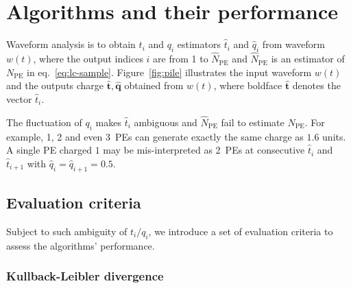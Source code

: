 \section{Algorithms and their performance}
\label{sec:algorithm}

Waveform analysis is to obtain $t_i$ and $q_i$ estimators $\hat{t}_i$ and $\hat{q}_i$ from waveform $w(t)$, where the output indices $i$ are from 1 to $\hat{N}_\mathrm{PE}$ and $\hat{N}_\mathrm{PE}$ is an estimator of $N_\mathrm{PE}$ in eq.~\eqref{eq:lc-sample}. Figure~\ref{fig:pile} illustrates the input waveform $w(t)$ and the outputs charge $\bm{\hat{t}}, \hat{\bm{q}}$ obtained from $w(t)$, where boldface $\hat{\bm{t}}$ denotes the vector $\hat{t}_i$. 

The fluctuation of $q_i$ makes $\hat{t}_i$ ambiguous and $\hat{N}_\mathrm{PE}$ fail to estimate $N_\mathrm{PE}$. For example, 1, 2 and even 3~PEs can generate exactly the same charge as $1.6$ units.  A single PE charged $1$ may be mis-interpreted as 2~PEs at consecutive $\hat{t}_i$ and $\hat{t}_{i+1}$ with $\hat{q}_i=\hat{q}_{i+1}=0.5$.

\subsection{Evaluation criteria}
\label{sec:criteria}
Subject to such ambiguity of $t_i/q_i$, we introduce a set of evaluation criteria to assess the algorithms' performance.

\subsubsection{Kullback-Leibler divergence}
\label{sec:pseudo}

